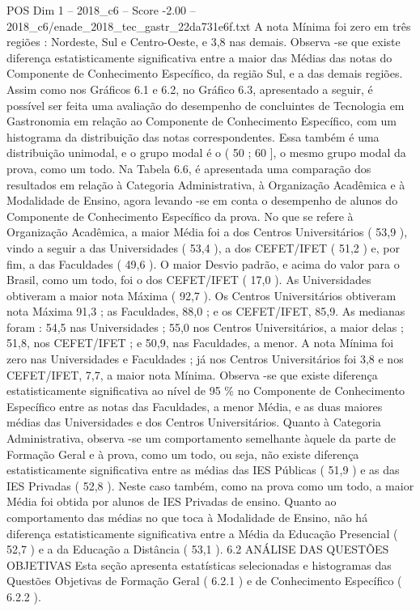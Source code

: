 \begin{textsample}{POS Dim 1 – 2018\_c6 – Score -2.00 – 2018\_c6/enade\_2018\_tec\_gastr\_22da731e6f.txt}
A nota Mínima foi zero em três regiões : Nordeste, Sul e Centro-Oeste, e 3,8 nas demais.
Observa -se que existe diferença estatisticamente significativa entre a maior das Médias das notas do Componente de Conhecimento Específico, da região Sul, e a das demais regiões.
Assim como nos Gráficos 6.1 e 6.2, no Gráfico 6.3, apresentado a seguir, é possível ser feita uma avaliação do desempenho de concluintes de Tecnologia em Gastronomia em relação ao Componente de Conhecimento Específico, com um histograma da distribuição das notas correspondentes.
Essa também é uma distribuição unimodal, e o grupo modal é o ( 50 ; 60 ], o mesmo grupo modal da prova, como um todo.
Na Tabela 6.6, é apresentada uma comparação dos resultados em relação à Categoria Administrativa, à Organização Acadêmica e à Modalidade de Ensino, agora levando -se em conta o desempenho de alunos do Componente de Conhecimento Específico da prova.
No que se refere à Organização Acadêmica, a maior Média foi a dos Centros Universitários ( 53,9 ), vindo a seguir a das Universidades ( 53,4 ), a dos CEFET/IFET ( 51,2 ) e, por fim, a das Faculdades ( 49,6 ).
O maior Desvio padrão, e acima do valor para o Brasil, como um todo, foi o dos CEFET/IFET ( 17,0 ).
As Universidades obtiveram a maior nota Máxima ( 92,7 ).
Os Centros Universitários obtiveram nota Máxima 91,3 ; as Faculdades, 88,0 ; e os CEFET/IFET, 85,9.
As medianas foram : 54,5 nas Universidades ; 55,0 nos Centros Universitários, a maior delas ; 51,8, nos CEFET/IFET ; e 50,9, nas Faculdades, a menor.
A nota Mínima foi zero nas Universidades e Faculdades ; já nos Centros Universitários foi 3,8 e nos CEFET/IFET, 7,7, a maior nota Mínima.
Observa -se que existe diferença estatisticamente significativa ao nível de 95 \% no Componente de Conhecimento Específico entre as notas das Faculdades, a menor Média, e as duas maiores médias das Universidades e dos Centros Universitários.
Quanto à Categoria Administrativa, observa -se um comportamento semelhante àquele da parte de Formação Geral e à prova, como um todo, ou seja, não existe diferença estatisticamente significativa entre as médias das IES Públicas ( 51,9 ) e as das IES Privadas ( 52,8 ).
Neste caso também, como na prova como um todo, a maior Média foi obtida por alunos de IES Privadas de ensino.
Quanto ao comportamento das médias no que toca à Modalidade de Ensino, não há diferença estatisticamente significativa entre a Média da Educação Presencial ( 52,7 ) e a da Educação a Distância ( 53,1 ). 6.2 ANÁLISE DAS QUESTÕES OBJETIVAS Esta seção apresenta estatísticas selecionadas e histogramas das Questões Objetivas de Formação Geral ( 6.2.1 ) e de Conhecimento Específico ( 6.2.2 ).

\end{textsample}
